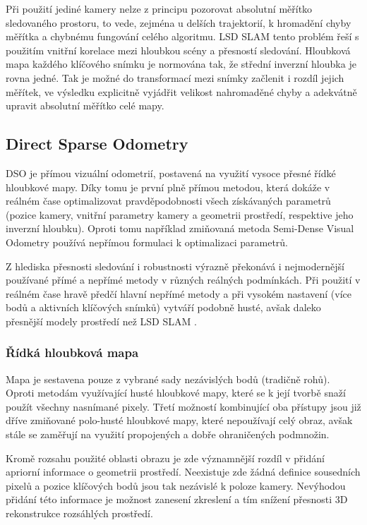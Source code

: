 \documentclass[12pt,a4paper]{article}
\begin{document}
Při použití jediné kamery nelze z principu pozorovat absolutní měřítko sledovaného prostoru, to vede, zejména u delších trajektorií, k hromadění chyby měřítka a chybnému fungování celého algoritmu. LSD SLAM tento problém řeší s použitím vnitřní korelace mezi hloubkou scény a přesností sledování. Hloubková mapa každého klíčového snímku je normována tak, že střední inverzní hloubka je rovna jedné. Tak je možné do transformací mezi snímky začlenit i rozdíl jejich měřítek, ve výsledku explicitně vyjádřit velikost nahromaděné chyby a adekvátně upravit absolutní měřítko celé mapy.

\subsection{Direct Sparse Odometry}
DSO je přímou vizuální odometrií, postavená na využití vysoce přesné řídké hloubkové mapy. Díky tomu je první plně přímou metodou, která dokáže v reálném čase optimalizovat pravděpodobnosti všech získávaných parametrů (pozice kamery, vnitřní parametry kamery a geometrii prostředí, respektive jeho inverzní hloubku). Oproti tomu například zmiňovaná metoda Semi-Dense Visual Odometry používá nepřímou formulaci k optimalizaci parametrů.

Z hlediska přesnosti sledování i robustnosti výrazně překonává i nejmodernější použí\-vané přímé a nepřímé metody v různých reálných podmínkách. Při použití v reálném čase hravě předčí hlavní nepřímé metody a při vysokém nastavení (více bodů a aktivních klíčových snímků) vytváří podobně husté, avšak daleko přesnější modely prostředí než LSD SLAM \cite{Engel2018_DSO}.

\subsubsection*{Řídká hloubková mapa} Mapa je sestavena pouze z vybrané sady nezávislých bodů (tradičně rohů). Oproti metodám využívající husté hloubkové mapy, které se k její tvorbě snaží použít všechny nasnímané pixely. Třetí možností kombinující oba přístupy jsou již dříve zmiňované polo-husté hloubkové mapy, které nepoužívají celý obraz, avšak stále se zaměřují na využití propojených a dobře ohraničených podmnožin. 

Kromě rozsahu použité oblasti obrazu je zde významnější rozdíl v přidání apriorní informace o geometrii prostředí. Neexistuje zde žádná definice sousedních pixelů a pozice klíčových bodů jsou tak nezávislé k poloze kamery. Nevýhodou přidání této informace je možnost zanesení zkreslení a tím snížení přesnosti 3D rekonstrukce rozsáhlých prostředí. 
\end{document}
